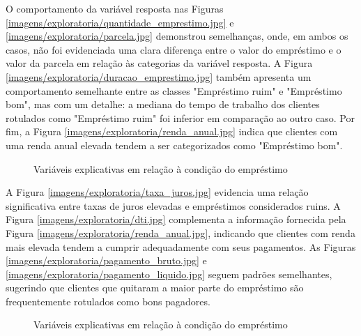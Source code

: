 O comportamento da variável resposta nas Figuras \ref{imagens/exploratoria/quantidade_emprestimo.jpg} 
e \ref{imagens/exploratoria/parcela.jpg} demonstrou semelhanças, onde, em ambos os casos,
não foi evidenciada uma clara diferença entre o valor do empréstimo e o valor da parcela em relação às
categorias da variável resposta. A Figura \ref{imagens/exploratoria/duracao_emprestimo.jpg} 
também apresenta um comportamento semelhante entre as classes
"Empréstimo ruim" e "Empréstimo bom", mas com um detalhe: a mediana do tempo de trabalho dos clientes rotulados 
como "Empréstimo ruim" foi inferior em comparação ao outro caso. Por fim, a Figura \ref{imagens/exploratoria/renda_anual.jpg} 
indica que clientes 
com uma renda anual elevada tendem a ser categorizados como "Empréstimo bom".


\begin{figure}[H]
  \centering
  \vspace{.5cm}
  \vspace{.5cm}
 \caption{Variáveis explicativas em relação à condição do empréstimo}
  
 \label{fig:exp_boxplot2}
\end{figure}

A Figura \ref{imagens/exploratoria/taxa_juros.jpg} evidencia uma relação significativa entre taxas de juros elevadas e empréstimos 
considerados ruins. A Figura \ref{imagens/exploratoria/dti.jpg} complementa a informação fornecida pela 
Figura \ref{imagens/exploratoria/renda_anual.jpg},
indicando que clientes com renda mais elevada tendem a cumprir adequadamente com seus pagamentos.
As Figuras \ref{imagens/exploratoria/pagamento_bruto.jpg} e  \ref{imagens/exploratoria/pagamento_liquido.jpg} 
seguem padrões semelhantes, sugerindo que clientes que quitaram a 
maior parte do empréstimo são frequentemente rotulados como bons pagadores.

\begin{figure}[H]
    \centering
    \vspace{.5cm}
    \vspace{.5cm}
    
    \label{fig:exp_bar1}
    \caption{Variáveis explicativas em relação à condição do empréstimo}
\end{figure}


